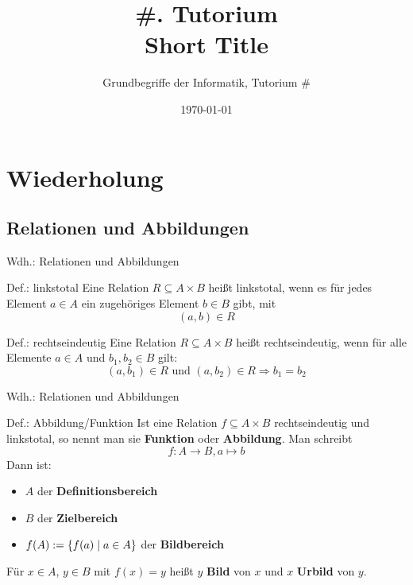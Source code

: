 



\title[Short Title]{\#. Tutorium\\ Short Title}
\subtitle{Grundbegriffe der Informatik, Tutorium \#\mytutnumber}
\date{\today}

\usepackage{tikz}


\titleframe
\roadmap

\section{Wiederholung}
\subsection{Relationen und Abbildungen}
\begin{frame}{Wdh.: Relationen und Abbildungen}
	\begin{block}{Def.: linkstotal}
	\pause
		Eine Relation $R \subseteq A \times B$ heißt linkstotal, wenn es für jedes Element $a \in A$ ein zugehöriges Element $b \in B$ gibt, mit $$(a,b) \in R$$
	\end{block}
	\pause
	\begin{block}{Def.: rechtseindeutig}
	\pause
		Eine Relation $R \subseteq A \times B$ heißt rechtseindeutig, wenn für alle Elemente $a \in A$ und $b_1, b_2 \in B$ gilt: $$(a,b_1) \in R \text{ und } (a,b_2) \in R \Rightarrow  b_1 = b_2$$
	\end{block}
\end{frame}

\begin{frame}{Wdh.: Relationen und Abbildungen}
	\begin{block}{Def.: Abbildung/Funktion}
		Ist eine Relation $f \subseteq A \times B$ rechtseindeutig und linkstotal, so nennt man sie \textbf{Funktion} oder \textbf{Abbildung}. 
		Man schreibt
		\[
			f : A \to B, a \mapsto b %
		\]
		\pause
		Dann ist:
		\begin{itemize}
			\item \(A\) der \textbf{Definitionsbereich}
			\item \(B\) der \textbf{Zielbereich}
			\item \(f(A) := \{ f(a) \mid a \in A \}\) der \textbf{Bildbereich}
		\end{itemize}
		Für \(x \in A\), \(y \in B\) mit \(f(x)=y\) heißt \(y\) \textbf{Bild} von \(x\) und \(x\) \textbf{Urbild} von \(y\).
	\end{block}
\end{frame}


